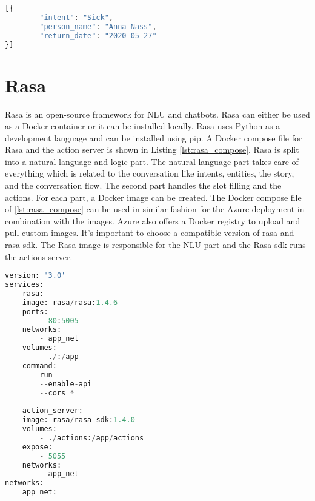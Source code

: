 \begin{lstlisting}[caption={Watson Assistant Request Format}, label={lst:watson_request},captionpos=b,frame=single,language={Python},commentstyle=\color{mygreen},keywordstyle=\color{blue},
    morekeywords={}]                
[{
        "intent": "Sick",
        "person_name": "Anna Nass",
        "return_date": "2020-05-27"
}]
\end{lstlisting}  


\section{Rasa}
Rasa is an open-source framework for NLU and chatbots.
Rasa\cite{rasa} can either be used as a Docker container or 
it can be installed locally.
Rasa uses Python as a development language and can be installed using pip.
A Docker compose file for Rasa and the action server is shown in Listing 
\ref{lst:rasa_compose}.
Rasa is split into a natural language and logic part.
The natural language part takes care of everything which is related to 
the conversation like intents, entities, the story, and the conversation flow.
The second part handles the slot filling and the actions.
For each part, a Docker image can be created.
The Docker compose file of \ref{lst:rasa_compose} can be used in similar fashion 
for the Azure deployment in combination with the images.
Azure also offers a Docker registry to upload and pull custom images.
It's important to choose a compatible version of rasa and rasa-sdk.
The Rasa image is responsible for the NLU part and the Rasa sdk runs the 
actions server.
\begin{lstlisting}[caption={Rasa Docker Compose File}, label={lst:rasa_compose},captionpos=b,frame=single,language={Python},commentstyle=\color{mygreen},keywordstyle=\color{blue},
    morekeywords={}]                
version: '3.0'
services:
    rasa:
    image: rasa/rasa:1.4.6
    ports:
        - 80:5005
    networks: 
        - app_net
    volumes:
        - ./:/app
    command:
        run 
        --enable-api
        --cors *
    
    action_server:
    image: rasa/rasa-sdk:1.4.0    
    volumes:
        - ./actions:/app/actions
    expose: 
        - 5055
    networks: 
        - app_net
networks: 
    app_net:
\end{lstlisting}  
